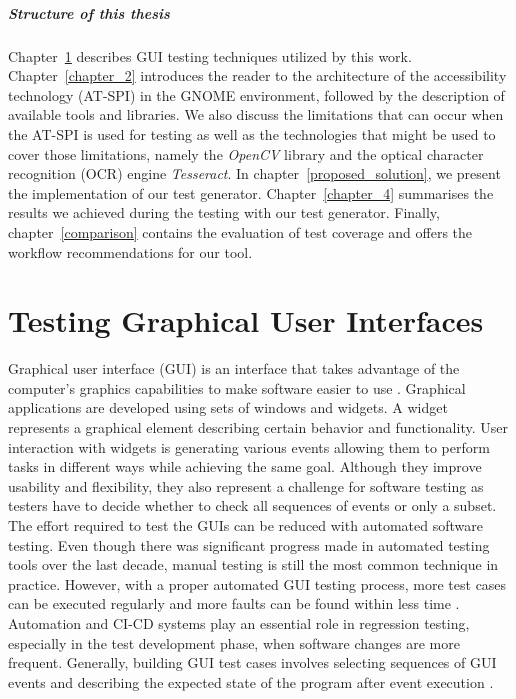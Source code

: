 \paragraph{Structure of this thesis} Chapter~\ref{chapter_1} describes GUI testing techniques utilized by this work. Chapter~\ref{chapter_2} introduces the reader to the architecture of the accessibility technology (AT-SPI) in the GNOME environment, followed by the description of available tools and libraries. We also discuss the limitations that can occur when the AT-SPI is used for testing as well as the technologies that might be used to cover those limitations, namely the \textit{OpenCV} library and the optical character recognition (OCR) engine \textit{Tesseract}. In chapter~\ref{proposed_solution}, we present the implementation of our test generator. Chapter~\ref{chapter_4} summarises the results we achieved during the testing with our test generator. Finally, chapter~\ref{comparison} contains the evaluation of test coverage and offers the workflow recommendations for our tool.

\chapter{Testing Graphical User Interfaces}\label{chapter_1}
Graphical user interface (GUI) is an interface that takes advantage of the computer's graphics capabilities to make software easier to use \cite{guidefinition}. Graphical applications are developed using sets of windows and widgets. A widget represents a graphical element describing certain behavior and functionality. User interaction with widgets is generating various events allowing them to perform tasks in different ways while achieving the same goal. Although they improve usability and flexibility, they also represent a challenge for software testing as testers have to decide whether to check all sequences of events or only a subset. The effort required to test the GUIs can be reduced with automated software testing. Even though there was significant progress made in automated testing tools over the last decade, manual testing is still the most common technique in practice. However, with a proper automated GUI testing process, more test cases can be executed regularly and more faults can be found within less time \cite{patternbasedtesting}. Automation and CI-CD systems play an essential role in regression testing, especially in the test development phase, when software changes are more frequent. Generally, building GUI test cases involves selecting sequences of GUI events and describing the expected state of the program after event execution \cite{NguyenBao2014Gait}.

